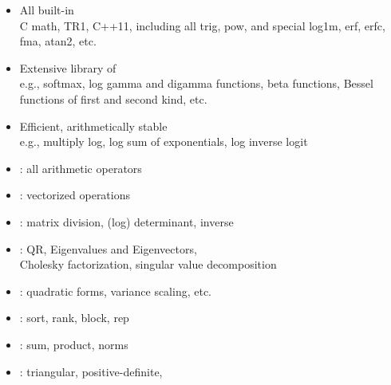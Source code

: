 \documentclass[10pt]{report}
\begin{document}

\begin{itemize}
\item All built-in 
  \\
  {\footnotesize C math, TR1, C++11, including all trig, pow, and
    special log1m, erf, erfc, fma, atan2, etc.}
\item Extensive library of 
  \\
  {\footnotesize e.g., softmax,
    log gamma and digamma functions, beta functions, Bessel functions of
    first and second kind, etc.}
\item Efficient, arithmetically stable 
  \\
  {\footnotesize e.g., multiply log, log sum of
    exponentials, log inverse logit}
\end{itemize}


\begin{itemize}\small
\item {}: all arithmetic operators
\item {}: vectorized operations
\item {}: matrix division, (log) determinant,
  inverse 
\item {}: QR, Eigenvalues and Eigenvectors, 
  \\
  Cholesky factorization, singular value decomposition
\item {}: quadratic forms, variance scaling, etc.
\item {}: sort, rank, block, rep
\item {}: sum, product, norms
\item {}: triangular, positive-definite,
\end{itemize}

\end{document}
